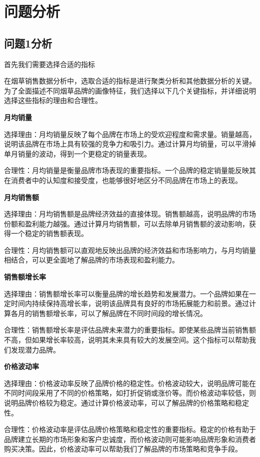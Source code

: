 \documentclass[a4paper]{article}
\begin{document}
\section{问题分析}
\subsection{问题1分析}

首先我们需要选择合适的指标

在烟草销售数据分析中，选取合适的指标是进行聚类分析和其他数据分析的关键。为了全面描述不同烟草品牌的画像特征，我们选择以下几个关键指标，并详细说明选择这些指标的理由和合理性。

\textbf{月均销量}

选择理由：月均销量反映了每个品牌在市场上的受欢迎程度和需求量。销量越高，说明该品牌在市场上具有较强的竞争力和吸引力。通过计算月均销量，可以平滑掉单月销量的波动，得到一个更稳定的销量表现。

合理性：月均销量是衡量品牌市场表现的重要指标。一个品牌的稳定销量能反映其在消费者中的认知度和接受度，也能够很好地区分不同品牌在市场上的表现。

\textbf{月均销售额}

选择理由：月均销售额是品牌经济效益的直接体现。销售额越高，说明品牌的市场份额和盈利能力越强。通过计算月均销售额，可以去除单月销售额的波动影响，获得一个稳定的销售额表现。

合理性：月均销售额可以直观地反映出品牌的经济效益和市场影响力，与月均销量相结合，可以更全面地了解品牌的市场表现和盈利能力。

\textbf{销售额增长率}

选择理由：销售额增长率可以衡量品牌的增长趋势和发展潜力。一个品牌如果在一定时间内持续保持高增长率，说明该品牌具有良好的市场拓展能力和前景。通过计算各月的销售额增长率，可以了解品牌在不同时间段的增长情况。

合理性：销售额增长率是评估品牌未来潜力的重要指标。即使某些品牌当前销售额不高，但如果增长率较高，说明其未来具有较大的发展空间。这个指标可以帮助我们发现潜力品牌。

\textbf{价格波动率}

选择理由：价格波动率反映了品牌价格的稳定性。价格波动较大，说明品牌可能在不同时间段采用了不同的价格策略，如打折促销或涨价等。而价格波动率较低，则说明品牌价格较为稳定。通过计算价格波动率，可以了解品牌的价格策略和稳定性。

合理性：价格波动率是评估品牌价格策略和稳定性的重要指标。稳定的价格有助于品牌建立长期的市场形象和客户忠诚度，而价格波动则可能影响品牌形象和消费者购买决策。因此，价格波动率可以帮助我们了解品牌的市场策略和竞争手段。
\end{document}
